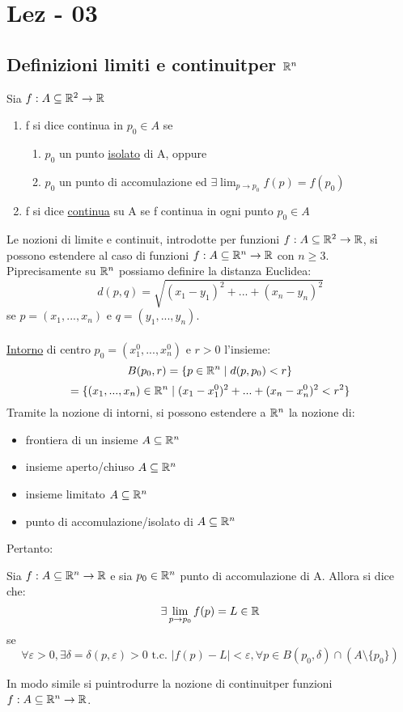 \section{Lez - 03}
\subsection{Definizioni limiti e continuit\aca per $\mathbb{R}^n$}
\begin{definition}
  Sia $f: A \subseteq \mathbb{R}^2 \to \mathbb{R}$
  \begin{enumerate}
    \item f si dice continua in $p_0 \in A$ se 
    \begin{enumerate}
      \item $p_0$ \ace un punto \underline{isolato} di A, oppure
      \item $p_0$ \ace un punto di accomulazione ed $\exists \lim_{p \to p_0} f(p) = f(p_0)$
    \end{enumerate}
    \item f si dice \underline{continua} su A se f \ace continua in ogni punto $p_0 \in A$
  \end{enumerate}
\end{definition}
Le nozioni di limite e continuit\aca, introdotte per funzioni $f: A \subseteq \mathbb{R}^2 \to \mathbb{R}$, si possono estendere
al caso di funzioni $f: A \subseteq \mathbb{R}^n \to \mathbb{R}$ con $n\geq 3$.\\
Pi\acu precisamente su $\mathbb{R}^n$ possiamo definire la distanza Euclidea:
$$d(p,q) = \sqrt{(x_1-y_1)^2+...+(x_n-y_n)^2}$$
se $p = (x_1, ..., x_n)$ e $q = (y_1, ..., y_n)$. \\\\
\underline{Intorno} di centro $p_0 = (x_1^0, ..., x_n^0)$ e $r>0$ \ace l'insieme:
$$B(p_0,r) = \{p \in \mathbb{R}^n \mid d(p,p_0) < r\}$$
$$= \{(x_1,...,x_n) \in \mathbb{R}^n \mid (x_1-x_1^0)^2+...+(x_n-x_n^0)^2 < r^2\}$$
Tramite la nozione di intorni, si possono estendere a $\mathbb{R}^n$ la nozione di:
\begin{itemize}
  \item frontiera di un insieme $A \subseteq \mathbb{R}^n$
  \item insieme aperto/chiuso $A \subseteq \mathbb{R}^n$
  \item insieme limitato $A \subseteq \mathbb{R}^n$
  \item punto di accomulazione/isolato di $A \subseteq \mathbb{R}^n$
\end{itemize}
Pertanto:
\begin{definition}
  Sia $f: A \subseteq \mathbb{R}^n \to \mathbb{R}$ e sia $p_0 \in \mathbb{R}^n$ punto di accomulazione di A. Allora si dice che:
  $$\exists \lim_{p \to p_0} f(p) = L \in \mathbb{R}$$
  se 
  $$\forall \varepsilon > 0, \exists \delta = \delta(p,\varepsilon) > 0 \text{ t.c. } 
  \lvert f(p) - L \rvert < \varepsilon, \forall p \in B(p_0,\delta) \cap (A \setminus \{p_0\})$$
\end{definition}
In modo simile si pu\aco introdurre la nozione di continuit\aca per funzioni $f: A \subseteq \mathbb{R}^n \to \mathbb{R}$.
